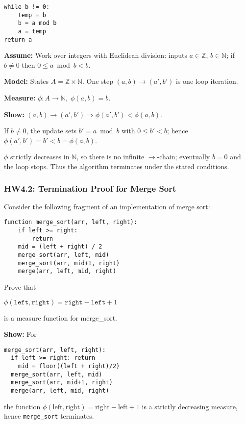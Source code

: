 \documentclass{article}
\theoremstyle{theorem}
\theoremstyle{definition}
\theoremstyle{remark}
\begin{document}
\begin{verbatim}
while b != 0:
    temp = b
    b = a mod b
    a = temp
return a
\end{verbatim}

\textbf{Assume:} Work over integers with Euclidean division: inputs $a\in\mathbb Z$, $b\in\mathbb N$; if $b\neq 0$ then $0\le a\bmod b<b$.

\textbf{Model:} States $A=\mathbb Z\times\mathbb N$. One step $(a,b)\to(a',b')$ is one loop iteration.

\textbf{Measure:} $\phi:A\to\mathbb N,\;\phi(a,b)=b$.

\textbf{Show:} $(a,b)\to(a',b') \Rightarrow \phi(a',b')<\phi(a,b)$.

If $b\neq 0$, the update sets $b'=a\bmod b$ with $0\le b'<b$; hence $\phi(a',b')=b'<b=\phi(a,b)$.

$\phi$ strictly decreases in $\mathbb N$, so there is no infinite $\to$-chain; eventually $b=0$ and the loop stops. Thus the algorithm terminates under the stated conditions.

\subsubsection{HW4.2: Termination Proof for Merge Sort}

Consider the following fragment of an implementation of merge sort:

\begin{verbatim}
function merge_sort(arr, left, right):
    if left >= right:
        return
    mid = (left + right) / 2
    merge_sort(arr, left, mid)
    merge_sort(arr, mid+1, right)
    merge(arr, left, mid, right)
\end{verbatim}

Prove that 

$\phi(\texttt{left}, \texttt{right}) = \texttt{right} - \texttt{left} + 1$ 

is a measure function for merge\_sort.

\textbf{Show:} For

\begin{verbatim}
merge_sort(arr, left, right):
  if left >= right: return
    mid = floor((left + right)/2)
  merge_sort(arr, left, mid)
  merge_sort(arr, mid+1, right)
  merge(arr, left, mid, right)
\end{verbatim}


the function $\phi(\text{left},\text{right})=\text{right}-\text{left}+1$ is a strictly decreasing measure, hence \texttt{merge\_sort} terminates.
\end{document}
